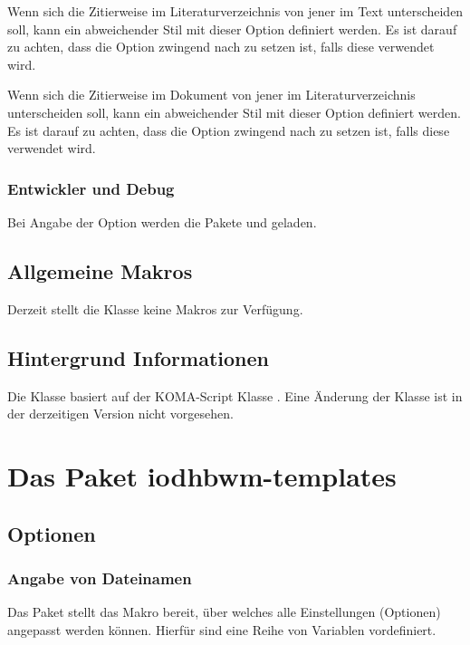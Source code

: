 \documentclass[babel=ngerman,highlight=false]{skdoc}
\begin{document}
                Wenn sich die Zitierweise im Literaturverzeichnis von jener im Text unterscheiden soll, kann ein abweichender Stil mit dieser Option definiert werden. Es ist darauf zu achten, dass die Option zwingend nach  zu setzen ist, falls diese verwendet wird.\medskip

                Wenn sich die Zitierweise im Dokument von jener im Literaturverzeichnis unterscheiden soll, kann ein abweichender Stil mit dieser Option definiert werden. Es ist darauf zu achten, dass die Option zwingend nach  zu setzen ist, falls diese verwendet wird.\medskip

            \subsubsection{Entwickler und Debug}
                Bei Angabe der Option werden die Pakete  und  geladen.

        \subsection{Allgemeine Makros}
            Derzeit stellt die Klasse keine Makros zur Verfügung.

        \subsection{Hintergrund Informationen}
            Die Klasse basiert auf der KOMA-Script Klasse . Eine Änderung der Klasse ist in der derzeitigen Version \theversion{} nicht vorgesehen.

    \section{Das Paket iodhbwm-templates}\label{pkg:iodhbwm-templates}
        \subsection{Optionen}\label{pkg:options}
            \subsubsection{Angabe von Dateinamen}
                Das Paket stellt das Makro \Macro{} bereit, über welches alle Einstellungen (Optionen) angepasst werden können. Hierfür sind eine Reihe von  Variablen vordefiniert.\medskip
    
\end{document}
